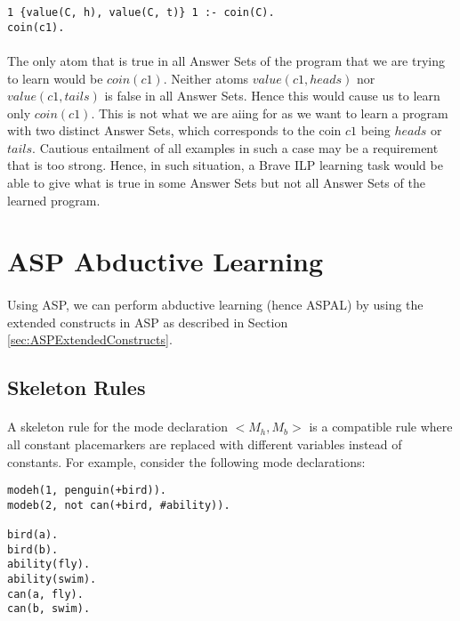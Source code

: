 \documentclass{article}
\theoremstyle{plain}
\theoremstyle{definition}
\begin{document}
\begin{multicols}{2}
\begin{lstlisting}
1 {value(C, h), value(C, t)} 1 :- coin(C).
coin(c1).
\end{lstlisting}

\paragraph{} The only atom that is true in all Answer Sets of the program that we are trying to learn would be $coin(c1)$. Neither atoms $value(c1, heads)$ nor $value(c1, tails)$ is false in all Answer Sets. Hence this would cause us to learn only $coin(c1)$. This is not what we are aiing for as we want to learn a program with two distinct Answer Sets, which corresponds to the coin $c1$ being $heads$ or $tails$. Cautious entailment of all examples in such a case may be a requirement that is too strong. Hence, in such situation, a Brave ILP learning task would be able to give what is true in some Answer Sets but not all Answer Sets of the learned program.

\section{ASP Abductive Learning}

\paragraph{} Using ASP, we can perform abductive learning (hence ASPAL) by using the extended constructs in ASP as described in Section \ref{sec:ASPExtendedConstructs}. 

\subsection{Skeleton Rules}

\paragraph{} A skeleton rule for the mode declaration $<M_h, M_b>$ is a compatible rule where all constant placemarkers are replaced with different variables instead of constants. For example, consider the following mode declarations:

\begin{lstlisting}
modeh(1, penguin(+bird)).
modeb(2, not can(+bird, #ability)).

bird(a).
bird(b).
ability(fly).
ability(swim).
can(a, fly).
can(b, swim).
\end{lstlisting}


\end{multicols}
\end{document}
